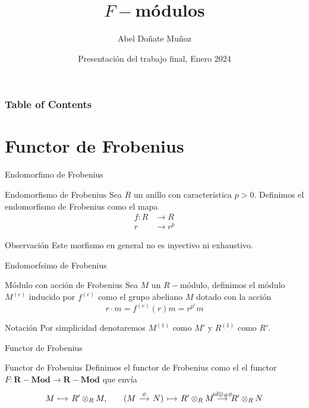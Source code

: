 \documentclass{beamer}
\title[F-módulos] %
{$F-$módulos}
\author[Abel Doñate] %
{Abel Doñate Muñoz}
\institute[UPC] %
{
  Universitat Politècica de Catalunya
}
\date[Enero 2024] %
{Presentación del trabajo final, Enero 2024}
\newcommand{\catname}[1]{{\mathbf{#1}}}
\newcommand{\Mod}{\catname{R-Mod}}
\begin{document}
\frame{\titlepage}


\begin{frame}
\frametitle{Table of Contents}
\tableofcontents
\end{frame}


\section{Functor de Frobenius}

\begin{frame}{Endomorfimo de Frobenius}
\begin{block}{Endomorfismo de Frobenius}
Sea $R$ un anillo con característica $p>0$. Definimos el endomorfismo de Frobenius como el mapa
\begin{align*}
f: R &\to R \\
r &\to r^p
\end{align*}
\end{block}    

\begin{block}{Observación}
    Este morfismo en general no es inyectivo ni exhaustivo.
\end{block}
\end{frame}

\begin{frame}{Endomorfsimo de Frobenius}
\begin{block}{Módulo con acción de Frobenius} Sea $M$ un  $R-$módulo, definimos el módulo $M^{(e)}$ inducido por $f^{(e)}$ como el grupo abeliano $M$  dotado con la acción
  \[
  r \cdot  m  = f ^{(e)}(r)m = r ^{p^e} m
  \] 
\end{block}
\begin{block}{Notación} Por simplicidad denotaremos $M^{(1)}$ como $M'$ y $R^{(1)}$ como $R'$.
\end{block}

\end{frame}

\begin{frame}[fragile]{Functor de Frobenius}
\begin{block}{Functor de Frobenius}
  Definimos el functor de Frobenius como el el functor $F:\Mod \to \Mod$ que envía
  \[\begin{tikzcd}[column sep=small]
	M & {R'\otimes_RM,} & {(M} & {N)} & {R'\otimes_R M} & {R'\otimes_RN}
	\arrow["\phi", from=1-3, to=1-4]
	\arrow["{id\otimes_R\phi}", from=1-5, to=1-6]
	\arrow[maps to, from=1-4, to=1-5]
	\arrow[maps to, from=1-1, to=1-2]
\end{tikzcd}\]
\end{block}
\end{frame}
\end{document}
